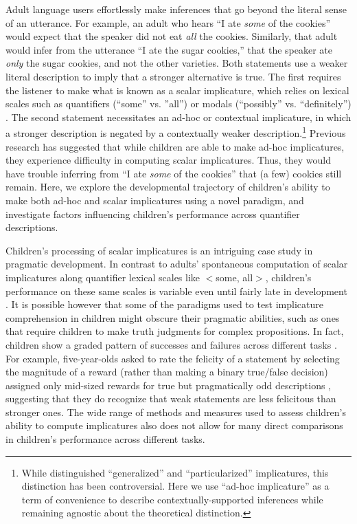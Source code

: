 \documentclass[man]{apa2}
\begin{document}
Adult language users effortlessly make inferences that go beyond the literal sense of an utterance. For example, an adult who hears ``I ate \emph{some} of the cookies'' would expect that the speaker did not eat \emph{all} the cookies. Similarly, that adult would infer from the utterance ``I ate the sugar cookies,'' that the speaker ate \emph{only} the sugar cookies, and not the other varieties. Both statements use a weaker literal description to imply that a stronger alternative is true. The first requires the listener to make what is known as a scalar implicature, which relies on lexical scales such as quantifiers (``some'' vs. ''all'') or modals (``possibly'' vs. ``definitely'') \cite{horn1972}. The second statement necessitates an ad-hoc or contextual implicature, in which a stronger description is negated by a contextually weaker description.\footnote{While  distinguished ``generalized'' and ``particularized'' implicatures, this distinction has been controversial. Here we use ``ad-hoc implicature'' as a term of convenience to describe contextually-supported inferences while remaining agnostic about the theoretical distinction.} Previous research has suggested that while children are able to make ad-hoc implicatures, they experience difficulty in computing scalar implicatures. Thus, they would have trouble inferring from ``I ate \emph{some} of the cookies'' that (a few) cookies still remain. Here, we explore the developmental trajectory of children's ability to make both ad-hoc and scalar implicatures using a novel paradigm, and investigate factors influencing children's performance across quantifier descriptions. 

Children's processing of scalar implicatures is an intriguing case study in pragmatic development. In contrast to adults' spontaneous computation of scalar implicatures along quantifier lexical scales like  $<${\sc some, all}$>$, children's performance on these same scales is variable even until fairly late in development \cite{noveck2001}. It is possible however that some of the paradigms used to test implicature comprehension in children might obscure their pragmatic abilities, such as ones that require children to make truth judgments for complex propositions. In fact, children show a graded pattern of successes and failures across different tasks \cite{guasti2005,papafragou2003, papafragou2004}. For example, five-year-olds asked to rate the felicity of a statement by selecting the magnitude of a reward (rather than making a binary true/false decision) assigned only mid-sized rewards for true but pragmatically odd descriptions \cite{katsos2011}, suggesting that they do recognize that weak statements are less felicitous than stronger ones. The wide range of methods and measures used to assess children's ability to compute implicatures also does not allow for many direct comparisons in children's performance across different tasks. 
\end{document}
